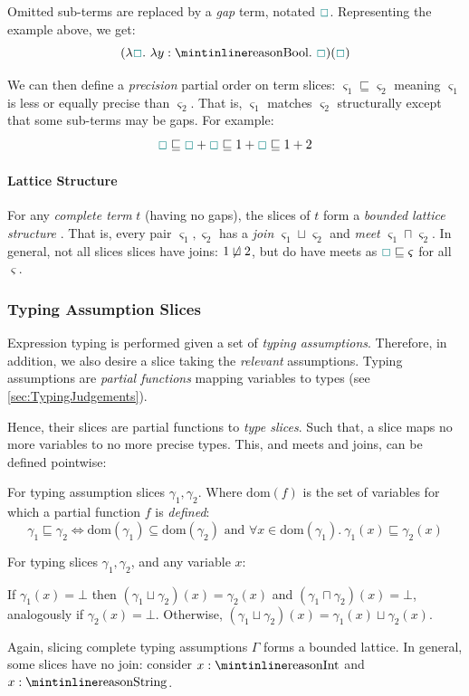 Omitted sub-terms are replaced by a \textit{gap} term, notated ${\color{teal}\Box}$. Representing the example above, we get:
\[(\lambda \gap.\ \lambda y : \code{Bool}.\ \gap)(\gap)\]

We can then define a \textit{precision} partial order \cite{PartialOrder} on term slices: $\varsigma_1 \sqsubseteq \varsigma_2$ meaning $\varsigma_1$ is less or equally precise than $\varsigma_2$. That is, $\varsigma_1$ matches $\varsigma_2$ structurally except that some sub-terms may be gaps. For example:
\[{\color{teal}\Box} \sqsubseteq{\color{teal}\Box} + {\color{teal}\Box}\sqsubseteq 1 + {\color{teal}\Box} \sqsubseteq 1 + 2\]

\paragraph{Lattice Structure}\label{sec:JoinTypesTheory} For any \textit{complete term} $t$ (having no gaps), the slices of $t$ form a \textit{bounded lattice structure} \cite{Lattice}. That is, every pair $\varsigma_1, \varsigma_2$ has a \textit{join} $\varsigma_1 \sqcup \varsigma_2$ and \textit{meet} $\varsigma_1 \sqcap \varsigma_2$. In general, not all slices slices have joins: $1 \centernot\sqcup 2$, but do have meets as ${\color{teal}\Box} \sqsubseteq \varsigma$ for all $\varsigma$.
 
\subsubsection{Typing Assumption Slices}
Expression typing is performed given a set of \textit{typing assumptions}. Therefore, in addition, we also desire a slice taking the \textit{relevant} assumptions. Typing assumptions are \textit{partial functions} mapping variables to types (see \cref{sec:TypingJudgements}). 

Hence, their slices are partial functions to \textit{type slices}. Such that, a slice maps no more variables to no more precise types. This, and meets and joins, can be defined pointwise:

\begin{definition}
For typing assumption slices $\gamma_1, \gamma_2$. Where $\mathrm{dom}(f)$ is the set of variables for which a partial function $f$ is \textit{defined}:
\[\gamma_1 \sqsubseteq \gamma_2 \iff \mathrm{dom}(\gamma_1) \subseteq \mathrm{dom}(\gamma_2) \text{ and } \forall x \in  \mathrm{dom}(\gamma_1).\ \gamma_1(x) \sqsubseteq \gamma_2(x)\]
\end{definition}
\begin{definition}
For typing slices $\gamma_1, \gamma_2$, and any variable $x$: 

If $\gamma_1(x) = \bot$ then $(\gamma_1 \sqcup \gamma_2)(x) = \gamma_2(x)$ and $(\gamma_1 \sqcap \gamma_2)(x) = \bot$, analogously if $\gamma_2(x) = \bot$. Otherwise, $(\gamma_1 \sqcup \gamma_2)(x) = \gamma_1(x) \sqcup \gamma_2(x)$.
\end{definition}
Again, slicing complete typing assumptions $\Gamma$ forms a bounded lattice. In general, some slices have no join: consider $x : \code{Int}$ and $x : \code{String}$.

